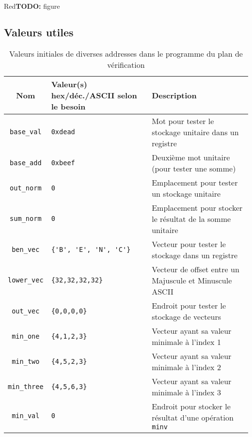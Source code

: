 \documentclass[a11paper]{article}
\newcommand{\todo}[1]{\begin{color}{Red}\textbf{TODO:} #1\end{color}}
\begin{document}
\todo{figure}

\begin{appendices}
\section{Valeurs utiles}

\begin{table}[H]
	\centering
	\footnotesize
	\caption{Valeurs initiales de diverses addresses dans le programme du plan de vérification}
	\label{tab:data}
	\begin{tabular}{@{}cp{5.5cm}l@{}}
		\toprule
    \textbf{Nom} &
    \textbf{Valeur(s)} hex/déc./ASCII selon le besoin &
    \textbf{Description} \\
		\midrule

    \verb|base_val|  & \verb|0xdead|               & Mot pour tester le stockage unitaire dans un registre        \\
    \verb|base_add|  & \verb|0xbeef|               & Deuxième mot unitaire (pour tester une somme)                \\
		\verb|out_norm|  & \verb|0|                    & Emplacement pour tester un stockage unitaire                 \\
		\verb|sum_norm|  & \verb|0|                    & Emplacement pour stocker le résultat de la somme unitaire    \\
		\verb|ben_vec|   & \verb|{'B', 'E', 'N', 'C'}| & Vecteur pour tester le stockage dans un registre             \\
		\verb|lower_vec| & \verb|{32,32,32,32}|        & Vecteur de offset entre un Majuscule et Minuscule ASCII      \\
		\verb|out_vec|   & \verb|{0,0,0,0}|            & Endroit pour tester le stockage de vecteurs                  \\
    \verb|min_one|   & \verb|{4,1,2,3}|            & Vecteur ayant sa valeur minimale à l'index 1 \\
    \verb|min_two|   & \verb|{4,5,2,3}|            & Vecteur ayant sa valeur minimale à l'index 2 \\
    \verb|min_three| & \verb|{4,5,6,3}|            & Vecteur ayant sa valeur minimale à l'index 3 \\
		\verb|min_val|   & \verb|0|                    & Endroit pour stocker le résultat d'une opération \verb|minv| \\

		\bottomrule
	\end{tabular}
\end{table}


\end{appendices}
\end{document}
